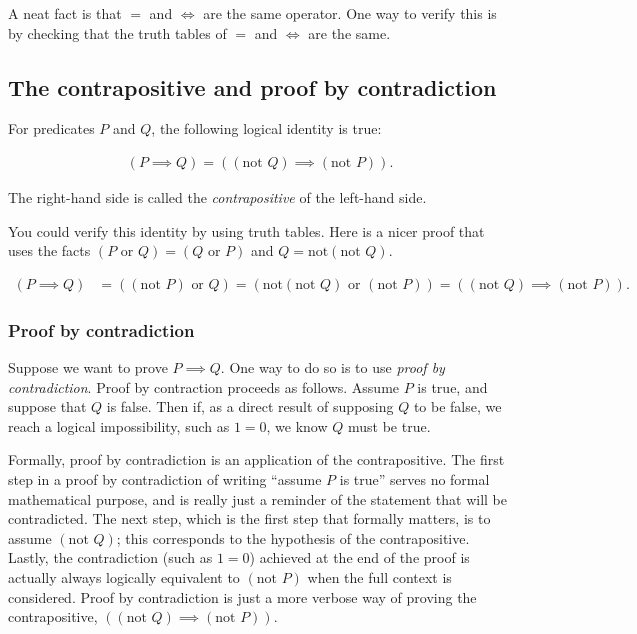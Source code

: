 A neat fact is that $=$ and $\iff$ are the same operator. One way to verify this is by checking that the truth tables of $=$ and $\iff$ are the same.

\subsection*{The contrapositive and proof by contradiction}

For predicates $P$ and $Q$, the following logical identity is true:

\begin{align*}
    (P \implies Q) = ((\text{not } Q) \implies (\text{not } P)).
\end{align*}

The right-hand side is called the \textit{contrapositive} of the left-hand side.

You could verify this identity by using truth tables. Here is a nicer proof that uses the facts $(P \text{ or } Q) = (Q \text{ or } P)$ and $Q = \text{not}(\text{not } Q)$.

\begin{align*}
    (P \implies Q) &= ((\text{not } P) \text{ or } Q ) 
    = (\text{not}(\text{not } Q) \text{ or } (\text{not } P))
    = ((\text{not } Q) \implies (\text{not } P)).
\end{align*}

\subsubsection{Proof by contradiction}

Suppose we want to prove $P \implies Q$. One way to do so is to use \textit{proof by contradiction}. Proof by contraction proceeds as follows. Assume $P$ is true, and suppose that $Q$ is false. Then if, as a direct result of supposing $Q$ to be false, we reach a logical impossibility, such as $1 = 0$, we know $Q$ must be true.

Formally, proof by contradiction is an application of the contrapositive. The first step in a proof by contradiction of writing ``assume $P$ is true'' serves no formal mathematical purpose, and is really just a reminder of the statement that will be contradicted. The next step, which is the first step that formally matters, is to assume $(\text{not } Q)$; this corresponds to the hypothesis of the contrapositive. Lastly, the contradiction (such as $1 = 0$) achieved at the end of the proof is actually always logically equivalent to $(\text{not } P)$ when the full context is considered. Proof by contradiction is just a more verbose way of proving the contrapositive, $((\text{not } Q) \implies (\text{not } P))$.

